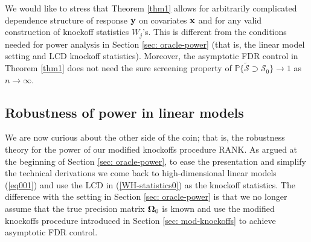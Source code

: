 \documentclass[11pt]{article}
\newcommand{\bx}{\mbox{\bf x}}
\newcommand{\by}{\mbox{\bf y}}
\newcommand{\bOmg}{\mbox{\boldmath $\Omega$}}
\newcommand{\wt}{\widetilde}
\begin{document}
We would like to stress that Theorem \ref{thm1} allows for arbitrarily complicated dependence structure of response $\by$ on covariates $\bx$ and for any valid construction of knockoff statistics $W_j$'s. This is different from the conditions needed for power analysis in Section \ref{sec: oracle-power} (that is, the linear model setting and LCD knockoff statistics). Moreover, the asymptotic FDR control in Theorem \ref{thm1} does not need the sure screening property of $\mathbb{P}\{\wt{\mathcal{S}} \supset \mathcal{S}_0\} \rightarrow 1$ as $n \rightarrow \infty$.

\subsection{Robustness of power in linear models}

We are now curious about the other side of the coin; that is, the robustness theory for the power of our modified knockoffs procedure RANK. As argued at the beginning of Section \ref{sec: oracle-power}, to ease the presentation and simplify the technical derivations we come back to high-dimensional linear models (\ref{eq001}) and use the LCD in (\ref{WH-statistics0}) as the knockoff statistics.  The difference with the setting in Section \ref{sec: oracle-power} is that we no longer assume that the true precision matrix $\bOmg_{0}$ is known and use the modified knockoffs procedure introduced in Section \ref{sec: mod-knockoffs} to achieve asymptotic FDR control.
\end{document}
